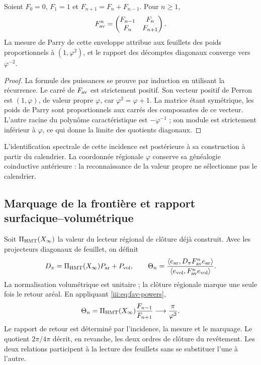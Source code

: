 \begin{proposition}
Soient $F_0=0$, $F_1=1$ et $F_{n+1}=F_n+F_{n-1}$. Pour $n\geq1$,
\begin{equation}
 F_{\rm av}^{n}=
 \begin{pmatrix}F_{n-1}&F_n\\F_n&F_{n+1}\end{pmatrix}.
 \label{iii:eq:fav-powers}
\end{equation}
La mesure de Parry de cette enveloppe attribue aux feuillets des poids proportionnels à $(1,\varphi^2)$, et le rapport des décomptes diagonaux converge vers $\varphi^{-2}$.
\end{proposition}
\begin{proof}
La formule des puissances se prouve par induction en utilisant la récurrence.
Le carré de $F_{\rm av}$ est strictement positif. Son vecteur positif de
Perron est $(1,\varphi)$, de valeur propre $\varphi$, car
$\varphi^2=\varphi+1$. La matrice étant symétrique, les poids de Parry sont
proportionnels aux carrés des composantes de ce vecteur. L’autre racine
du polynôme caractéristique est $-\varphi^{-1}$ ; son module est strictement
inférieur à $\varphi$, ce qui donne la limite des quotients diagonaux.
\end{proof}

L’identification spectrale de cette incidence est postérieure à sa construction
à partir du calendrier. La coordonnée régionale $\varphi$ conserve sa généalogie
coinductive antérieure : la reconnaissance de la valeur propre ne sélectionne pas le calendrier.

\subsection{Marquage de la frontière et rapport surfacique--volumétrique}

Soit $\Pi_{\rm HMT}(X_\infty)$ la valeur du lecteur régional de clôture déjà construit. Avec les projecteurs diagonaux de feuillet, on définit
\begin{equation}
 D_\pi=\Pi_{\rm HMT}(X_\infty)P_{\rm ar}+P_{\rm vol},\qquad
 \Theta_n=
 \frac{\langle e_{\rm ar},D_\pi F_{\rm av}^{n}e_{\rm ar}\rangle}
 {\langle e_{\rm vol},F_{\rm av}^{n}e_{\rm vol}\rangle}.
 \label{iii:eq:marked-return}
\end{equation}
La normalisation volumétrique est unitaire ; la clôture régionale marque une seule fois
le retour aréal. En appliquant \eqref{iii:eq:fav-powers},
\begin{equation}
 \Theta_n=\Pi_{\rm HMT}(X_\infty)\frac{F_{n-1}}{F_{n+1}}
 \longrightarrow\frac{\pi}{\varphi^2}.
 \label{iii:eq:av-limit}
\end{equation}
Le rapport de retour est déterminé par l'incidence, la mesure et le marquage. Le quotient $2\pi/4\pi$ décrit, en revanche, les deux ordres de clôture du revêtement. Les deux relations participent à la lecture des feuillets sans se substituer l'une à l'autre.

